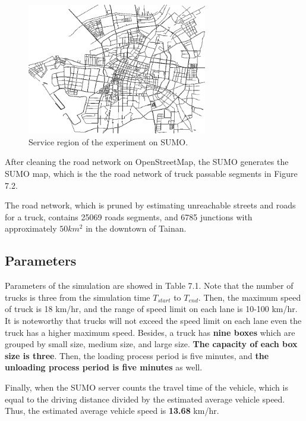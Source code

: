 \documentclass[12pt]{ksthesis}
\begin{document}
\begin{thesis}
{\begin{figure}[H]
\centering
\includegraphics[width=0.7\textwidth]{./Thesis_figures/F7-2_SUMOMap.PNG}
\caption{\large  Service region of the experiment on SUMO.}
\vspace{0.5cm}
\label{Fig:SUMOMap}
\end{figure}

After cleaning the road network on OpenStreetMap, the SUMO generates the SUMO map, which is the the road network of truck passable segments in Figure 7.2.

The road network, which is pruned by estimating unreachable streets and roads for a truck, contains 25069 roads segments, and 6785 junctions with approximately \textbf{$50km^{2}$   }in the downtown of Tainan.




\subsection{Parameters}
Parameters of the simulation are showed in Table 7.1. Note that the number of trucks is three from the simulation time $T_{start}$ to $T_{end}$. 
Then, the maximum speed of truck is 18 km/hr, and the range of speed limit on each lane is 10-100 km/hr. It is noteworthy that trucks will not exceed the speed limit on each lane even the truck has a higher maximum speed. Besides, a truck has \textbf{nine boxes} which are grouped by small size, medium size, and large size. \textbf{The capacity of each box size is three}. 
Then, the loading process period is five minutes, and \textbf{the unloading process period is five minutes} as well. 

Finally, when the SUMO server counts the travel time of the vehicle, which is equal to the driving distance divided by the estimated average vehicle speed. Thus, the estimated average vehicle speed is \textbf{13.68} km/hr.



}
\end{thesis}
\end{document}
